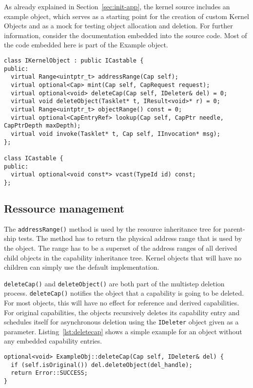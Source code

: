As already explained in Section~\ref{sec:init-app}, the kernel source includes
an example object, which serves as a starting point for the creation of custom
Kernel Objects and as a mock for testing object allocation and deletion. For
further information, consider the documentation embedded into the source code.
Most of the code embedded here is part of the Example object.

\lstset{language=c++, numbers=left}
\begin{lstlisting}[float, label=lst:ikernelobject, caption=The \texttt{IKernelObject} interface.]
class IKernelObject : public ICastable {
public:
  virtual Range<uintptr_t> addressRange(Cap self);
  virtual optional<Cap> mint(Cap self, CapRequest request);
  virtual optional<void> deleteCap(Cap self, IDeleter& del) = 0;
  virtual void deleteObject(Tasklet* t, IResult<void>* r) = 0;
  virtual Range<uintptr_t> objectRange() const = 0;
  virtual optional<CapEntryRef> lookup(Cap self, CapPtr needle, CapPtrDepth maxDepth);
  virtual void invoke(Tasklet* t, Cap self, IInvocation* msg);
};

class ICastable {
public:
  virtual optional<void const*> vcast(TypeId id) const;
};
\end{lstlisting}

\subsection{Ressource management}

The \texttt{addressRange()} method is used by the resource inheritance
tree for parent-ship tests. The method has to return the physical
address range that is used by the object. The range has to be a
superset of the address ranges of all derived child objects in the
capability inheritance tree. Kernel objects that will have no children
can simply use the default implementation.

\texttt{deleteCap()} and \texttt{deleteObject()} are both part of the
multistep deletion process. \texttt{deleteCap()} notifies the object
that a capability is going to be deleted. For most objects, this will
have no effect for reference and derived capabilities. For original
capabilities, the objects recursively deletes its capability entry and
schedules itself for asynchronous deletion using the \texttt{IDeleter}
object given as a parameter. Listing~\ref{lst:deletecap} shows a simple example
for an object without any embedded capability entries.

\begin{lstlisting}[float, label=lst:deletecap, caption=Example handler for capability revocation.]
optional<void> ExampleObj::deleteCap(Cap self, IDeleter& del) {
  if (self.isOriginal()) del.deleteObject(del_handle);
  return Error::SUCCESS;
}
\end{lstlisting}

